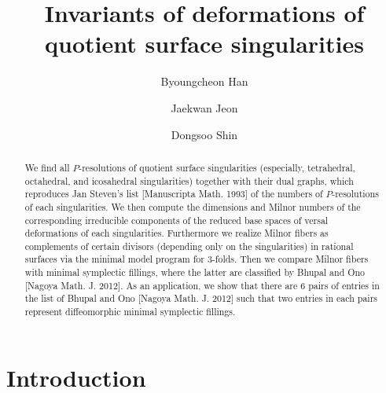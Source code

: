\documentclass[reqno, twoside, a4paper]{amsart}
\theoremstyle{definition}
\numberwithin{equation}{section}
\begin{document}
\title[Invariants of deformations of quotient surface singularities]{Invariants of deformations of quotient surface singularities}

\author[B. Han]{Byoungcheon Han}

\address{Department of Mathematics, Chungnam National University, Daejeon 34134, Korea}


\author[J. Jeon]{Jaekwan Jeon}

\address{Department of Mathematics, Chungnam National University, Daejeon 34134, Korea}


\author[D. Shin]{Dongsoo Shin}

\address{Department of Mathematics, Chungnam National University, Daejeon 34134, Korea}




\begin{abstract}
We find all $P$-resolutions of quotient surface singularities (especially, tetrahedral, octahedral, and icosahedral singularities) together with their dual graphs, which reproduces Jan Steven's list [Manuscripta Math. 1993] of the numbers of $P$-resolutions of each singularities. We then compute the dimensions and Milnor numbers of the corresponding irreducible components of the reduced base spaces of versal deformations of each singularities. Furthermore we realize Milnor fibers as complements of certain divisors (depending only on the singularities) in rational surfaces via the minimal model program for 3-folds. Then we compare Milnor fibers with minimal symplectic fillings, where the latter are classified by Bhupal and Ono [Nagoya Math. J. 2012]. As an application, we show that there are 6 pairs of entries in the list of Bhupal and Ono [Nagoya Math. J. 2012] such that two entries in each pairs represent diffeomorphic minimal symplectic fillings.
\end{abstract}

\maketitle






\section{Introduction}
\end{document}
